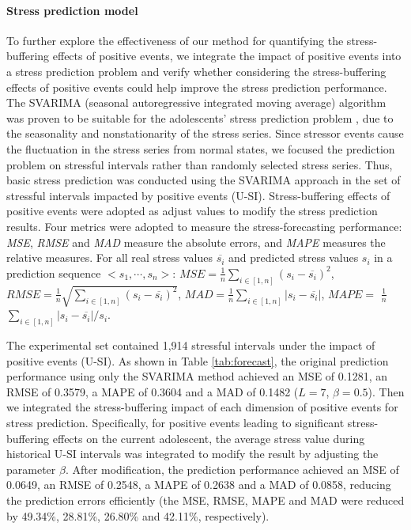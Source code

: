 \paragraph{Stress prediction model} 
To further explore the effectiveness of our method for quantifying the stress-buffering effects of positive events,
we integrate the impact of positive events into a stress prediction problem
and verify whether considering the stress-buffering effects of positive events could help improve the stress prediction performance. 
The SVARIMA (seasonal autoregressive integrated moving average) algorithm was proven to be suitable for the adolescents' stress prediction problem \citep{Li2015Predicting, Shumway2006Time},
due to the seasonality and nonstationarity of the stress series.
Since stressor events cause the fluctuation in the stress series from normal states,
we focused the prediction problem on stressful intervals rather than randomly selected stress series.
Thus, basic stress prediction was conducted using the SVARIMA approach in the set of stressful intervals impacted by positive events (U-SI).
Stress-buffering effects of positive events were adopted as adjust values to modify the stress prediction results.
Four metrics were adopted to measure the stress-forecasting performance:
\emph{MSE}, \emph{RMSE} and \emph{MAD} measure the absolute errors,
and \emph{MAPE} measures the relative measures.
For all real stress values $\overline{s_i}$ and predicted stress values $s_i$ in a prediction sequence $<s_1,\cdots,s_n>$:
$MSE = \frac{1}{n}\sum_{i\in[1,n]}(s_i-\overline{s_i})^2$,
$RMSE = \frac{1}{n}\sqrt{\sum_{i\in[1,n]}(s_i-\overline{s_i})^2}$,
$MAD = \frac{1}{n}\sum_{i\in[1,n]}|s_i-\overline{s_i}|$,
$MAPE = $ $\frac{1}{n}$ $\sum_{i\in[1,n]}{|s_i-\overline{s_i}|/s_i}$.

The experimental set contained 1,914 stressful intervals under the impact of positive events (U-SI).
As shown in Table \ref{tab:forecast},
the original prediction performance using only the SVARIMA method
achieved an MSE of 0.1281, an RMSE of 0.3579, a MAPE of 0.3604 and a MAD of 0.1482 ($L = 7$, $\beta = 0.5$).
Then we integrated the stress-buffering impact of each dimension of positive events for stress prediction.
Specifically, for positive events leading to significant stress-buffering effects on the current adolescent,
the average stress value during historical U-SI intervals was integrated to modify the result by adjusting the parameter $\beta$.
After modification,
the prediction performance achieved an MSE of 0.0649, an RMSE of 0.2548, a MAPE of 0.2638 and a MAD of 0.0858,
reducing the prediction errors efficiently (the MSE, RMSE, MAPE and MAD were reduced by 49.34\%, 28.81\%, 26.80\% and 42.11\%, respectively).


